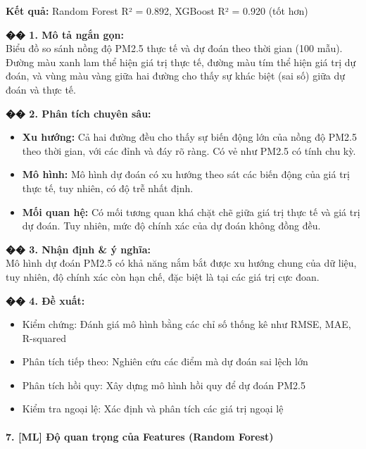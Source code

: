 \documentclass[12pt,a4paper]{article}
\begin{document}
\begin{aibox}
\textbf{Kết quả:} Random Forest R² = 0.892, XGBoost R² = 0.920 (tốt hơn)

\textbf{�� 1. Mô tả ngắn gọn:}\\
Biểu đồ so sánh nồng độ PM2.5 thực tế và dự đoán theo thời gian (100 mẫu). Đường màu xanh lam thể hiện giá trị thực tế, đường màu tím thể hiện giá trị dự đoán, và vùng màu vàng giữa hai đường cho thấy sự khác biệt (sai số) giữa dự đoán và thực tế.

\textbf{�� 2. Phân tích chuyên sâu:}
\begin{itemize}
    \item \textbf{Xu hướng:} Cả hai đường đều cho thấy sự biến động lớn của nồng độ PM2.5 theo thời gian, với các đỉnh và đáy rõ ràng. Có vẻ như PM2.5 có tính chu kỳ.
    \item \textbf{Mô hình:} Mô hình dự đoán có xu hướng theo sát các biến động của giá trị thực tế, tuy nhiên, có độ trễ nhất định.
    \item \textbf{Mối quan hệ:} Có mối tương quan khá chặt chẽ giữa giá trị thực tế và giá trị dự đoán. Tuy nhiên, mức độ chính xác của dự đoán không đồng đều.
\end{itemize}

\textbf{�� 3. Nhận định \& ý nghĩa:}\\
Mô hình dự đoán PM2.5 có khả năng nắm bắt được xu hướng chung của dữ liệu, tuy nhiên, độ chính xác còn hạn chế, đặc biệt là tại các giá trị cực đoan.

\textbf{�� 4. Đề xuất:}
\begin{itemize}
    \item Kiểm chứng: Đánh giá mô hình bằng các chỉ số thống kê như RMSE, MAE, R-squared
    \item Phân tích tiếp theo: Nghiên cứu các điểm mà dự đoán sai lệch lớn
    \item Phân tích hồi quy: Xây dựng mô hình hồi quy để dự đoán PM2.5
    \item Kiểm tra ngoại lệ: Xác định và phân tích các giá trị ngoại lệ
\end{itemize}
\end{aibox}

\paragraph{7. [ML] Độ quan trọng của Features (Random Forest)}
\end{document}
